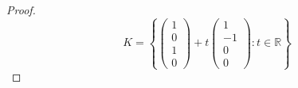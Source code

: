 \documentclass[11pt]{scrartcl}
\begin{document}
\begin{enumerate}[label=\alph*.]
{\begin{proof}
		      \[
			      K=
			      \left\{
			      \begin{pmatrix}
				      1 \\
				      0 \\
				      1 \\
				      0
			      \end{pmatrix}+
			      t\begin{pmatrix}
				      1  \\
				      -1 \\
				      0  \\
				      0
			      \end{pmatrix}: t \in \mathbb{R}
			      \right\}
		      \]
	      \end{proof}
	      }
\end{enumerate}

\end{document}
